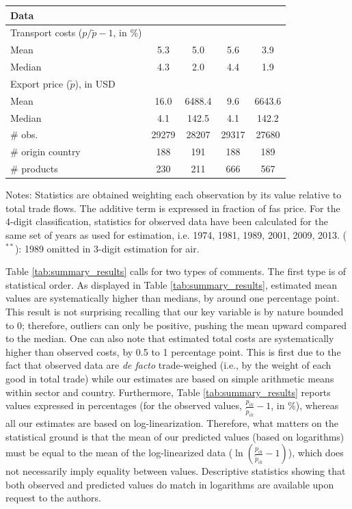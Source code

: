 \documentclass[a4paper,11pt]{article}
\begin{document}
\begin{table}[htbp]
{\begin{center}
\begin{tabular}{l|cc|cc}
    \multicolumn{5}{l}{\textbf{Data}  } \\ \hline
    Transport costs ($p/\widetilde{p} -1$, in \%) & & & & \\ \hline
    Mean & 5.3 & 5.0& 5.6&3.9 \\
    Median & 4.3 & 2.0 & 4.4& 1.9 \\ \hline
    Export price ($\widetilde{p}$), in USD & & & & \\
    Mean & 16.0 &	6488.4	&9.6	&6643.6 \\
    Median & 4.1	& 142.5	& 4.1	& 142.2 \\ \hline
    \# obs.
& 29279 & 28207 & 29317 & 27680 \\
    \# origin country & 188 & 191 & 188 & 189 \\
    \# products & 230 & 211 & 666 & 567 \\  \hline \hline
  \end{tabular}
    \end{center}}
\parbox[l]{10cm}{\tiny{Notes: Statistics are obtained weighting each observation by its value relative to total trade flows.
The additive term is expressed in fraction of fas price.
For the  4-digit classification, statistics for observed data have been calculated for the same set of years as used for estimation, i.e.
1974, 1981, 1989, 2001, 2009, 2013.
($^{\ast \ast}$): 1989 omitted in 3-digit estimation for air.}}
\end{table}%

Table \ref{tab:summary_results} calls for two types of comments.
The first type is of statistical order.
As displayed in Table \ref{tab:summary_results}, estimated mean values are systematically higher than medians, by around one percentage point.
This result is not surprising recalling that our key variable is by nature bounded to 0; therefore, outliers can only be positive, pushing the mean upward compared to the median.
One can also note that estimated total costs are systematically higher than observed costs, by 0.5 to 1 percentage point.
This is first due to the fact that observed data are \textit{de facto} trade-weighed (i.e., by the weight of each good in total trade) while our estimates are based on simple arithmetic means within sector and country.
Furthermore, Table \ref{tab:summary_results} reports values expressed in percentages (for the observed values, $\frac{p_{ik}}{\widetilde{p}_{ik}} -1$, in \%), whereas all our estimates are based on log-linearization.
Therefore, what matters on the statistical ground is that the mean of our predicted values (based on logarithms) must be equal to the mean of the log-linearized data ($\ln\left(\frac{p_{ik}}{\widetilde{p}_{ik}}-1 \right)$), which does not necessarily imply equality between values.
Descriptive statistics showing that both observed and predicted values do match in logarithms are available upon request to the authors.%
\end{document}
